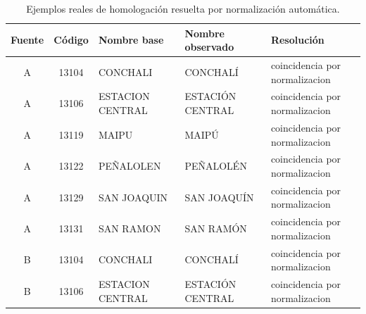 \begin{table}[htbp]
\centering
\footnotesize
\caption{Ejemplos reales de homologación resuelta por normalización automática.}
\begin{tabular}{|c|c|p{3.0cm}|p{3.0cm}|p{4.5cm}|}
\hline
Fuente & Código & Nombre base & Nombre observado & Resolución \\
\hline
A & 13104 & CONCHALI & CONCHALÍ & coincidencia por normalizacion \\
A & 13106 & ESTACION CENTRAL & ESTACIÓN CENTRAL & coincidencia por normalizacion \\
A & 13119 & MAIPU & MAIPÚ & coincidencia por normalizacion \\
A & 13122 & PEÑALOLEN & PEÑALOLÉN & coincidencia por normalizacion \\
A & 13129 & SAN JOAQUIN & SAN JOAQUÍN & coincidencia por normalizacion \\
A & 13131 & SAN RAMON & SAN RAMÓN & coincidencia por normalizacion \\
B & 13104 & CONCHALI & CONCHALÍ & coincidencia por normalizacion \\
B & 13106 & ESTACION CENTRAL & ESTACIÓN CENTRAL & coincidencia por normalizacion \\
\hline
\end{tabular}
\end{table}
